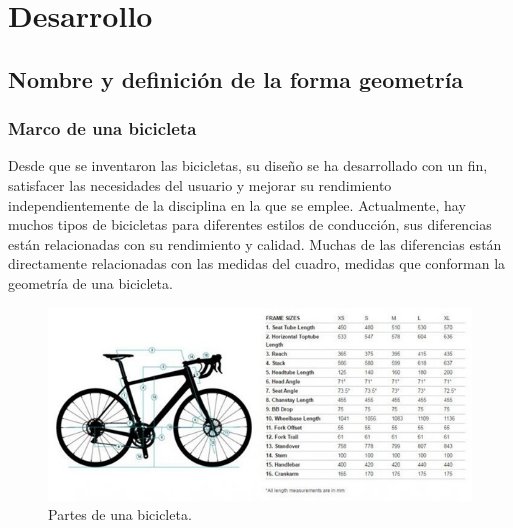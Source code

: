 \documentclass{article}
\begin{document}
\section{Desarrollo}
\subsection{Nombre y definición de la forma geometría}
\subsubsection{Marco de una bicicleta}
Desde que se inventaron las bicicletas, su diseño se ha desarrollado con un fin, satisfacer las necesidades del usuario y mejorar su rendimiento independientemente de la disciplina en la que se emplee\cite{rf2}. Actualmente, hay muchos tipos de bicicletas para diferentes estilos de conducción, sus diferencias están relacionadas con su rendimiento y calidad. Muchas de las diferencias están directamente relacionadas con las medidas del cuadro, medidas que conforman la geometría de una bicicleta. \\
\begin{figure} [htp]%
    \centering
    \includegraphics[width=150mm]{Imagen1.jpg} %
    \caption{Partes de una bicicleta.}
    \label{grafica}
\end{figure}
\newpage
\end{document}
